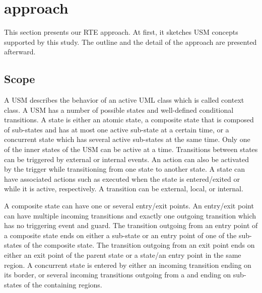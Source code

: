 \section{approach}
\label{sec:approach}
This section presents our RTE approach. At first, it sketches USM concepts supported by this study. The outline and the detail of the approach are presented afterward.
\subsection{Scope}
A USM describes the behavior of an active UML class which is called context class. A USM has a number of possible states and well-defined conditional transitions. A state is either an atomic state, a composite state that is composed of sub-states and has at most one active sub-state at a certain time, or a concurrent state which has several active sub-states at the same time. Only one of the inner states of the USM can be active at a time. Transitions between states can be triggered by external or internal events. An action can also be activated by the trigger while transitioning from one state to another state. A state can have associated actions such as  executed when the state is entered/exited or while it is active, respectively. A transition can be external, local, or internal.

A composite state can have one or several entry/exit points. An entry/exit point can have multiple incoming transitions and exactly one outgoing transition which has no triggering event and guard. The transition outgoing from an entry point of a composite state ends on either a sub-state or an entry point of one of the sub-states of the composite state. The transition outgoing from an exit point ends on either an exit point of the parent state or a state/an entry point in the same region. A concurrent state is entered by either an incoming transition ending on its border, or several incoming transitions outgoing from a  and ending on sub-states of the containing regions. 



